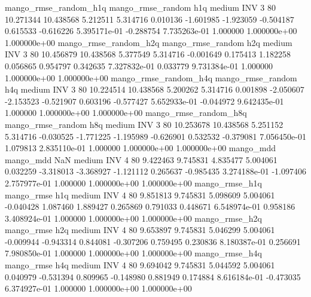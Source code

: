 mango_rmse_random_h1q mango_rmse_random                  h1q     medium      INV                 3 80 10.271344      10.438568 5.212511       5.314716    0.010136     -1.601985     -1.923059    -0.504187       0.615533 -0.616226 5.395171e-01    -0.288754   7.735263e-01            1.000000    1.000000e+00        1.000000e+00
mango_rmse_random_h2q mango_rmse_random                  h2q     medium      INV                 3 80 10.456879      10.438568 5.377549       5.314716   -0.001649      0.175413      1.182258     0.056865       0.954797  0.342635 7.327832e-01     0.033779   9.731384e-01            1.000000    1.000000e+00        1.000000e+00
mango_rmse_random_h4q mango_rmse_random                  h4q     medium      INV                 3 80 10.224514      10.438568 5.200262       5.314716    0.001898     -2.050607     -2.153523    -0.521907       0.603196 -0.577427 5.652933e-01    -0.044972   9.642435e-01            1.000000    1.000000e+00        1.000000e+00
mango_rmse_random_h8q mango_rmse_random                  h8q     medium      INV                 3 80 10.253678      10.438568 5.251152       5.314716   -0.030525     -1.771225     -1.195989    -0.626901       0.532532 -0.379081 7.056450e-01     1.079813   2.835110e-01            1.000000    1.000000e+00        1.000000e+00
            mango_mdd         mango_mdd                  NaN     medium      INV                 4 80  9.422463       9.745831 4.835477       5.004061    0.032259     -3.318013     -3.368927    -1.121112       0.265637 -0.985435 3.274188e-01    -1.097406   2.757977e-01            1.000000    1.000000e+00        1.000000e+00
       mango_rmse_h1q        mango_rmse                  h1q     medium      INV                 4 80  9.851813       9.745831 5.098609       5.004061   -0.040428      1.087460      1.889427     0.265869       0.791033  0.448671 6.548974e-01     0.958186   3.408924e-01            1.000000    1.000000e+00        1.000000e+00
       mango_rmse_h2q        mango_rmse                  h2q     medium      INV                 4 80  9.653897       9.745831 5.046299       5.004061   -0.009944     -0.943314      0.844081    -0.307206       0.759495  0.230836 8.180387e-01     0.256691   7.980850e-01            1.000000    1.000000e+00        1.000000e+00
       mango_rmse_h4q        mango_rmse                  h4q     medium      INV                 4 80  9.694042       9.745831 5.044592       5.004061    0.040979     -0.531394      0.809965    -0.148980       0.881949  0.174884 8.616184e-01    -0.473035   6.374927e-01            1.000000    1.000000e+00        1.000000e+00
